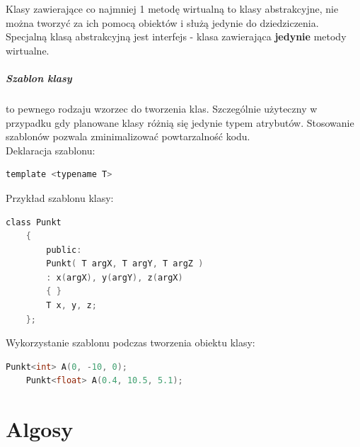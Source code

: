 \documentclass[a4paper,12pt,oneside]{book}
\begin{document}
				Klasy zawierające co najmniej 1 metodę wirtualną to klasy abstrakcyjne, nie można tworzyć za ich pomocą obiektów i służą jedynie do dziedziczenia.\\
				
				Specjalną klasą abstrakcyjną jest interfejs - klasa zawierająca \textbf{jedynie} metody wirtualne.
				
				
				\subparagraph{Szablon klasy}to pewnego rodzaju wzorzec do tworzenia klas. Szczególnie użyteczny w przypadku gdy planowane klasy różnią się jedynie typem atrybutów. Stosowanie szablonów pozwala zminimalizować powtarzalność kodu.\\
				
				Deklaracja szablonu:
				\begin{lstlisting}[language=C]
	template <typename T>
				\end{lstlisting}
			
				Przykład szablonu klasy:
				\begin{lstlisting}[language=C]
	class Punkt 
	{ 
	    public: 
	    Punkt( T argX, T argY, T argZ ) 
	    : x(argX), y(argY), z(argX) 
	    { } 
	    T x, y, z; 
	};
				\end{lstlisting}
			
				Wykorzystanie szablonu podczas tworzenia obiektu klasy: 
				\begin{lstlisting}[language=C]
	Punkt<int> A(0, -10, 0); 
	Punkt<float> A(0.4, 10.5, 5.1);
				\end{lstlisting}
		
		\newpage\section{Algosy}
\end{document}
